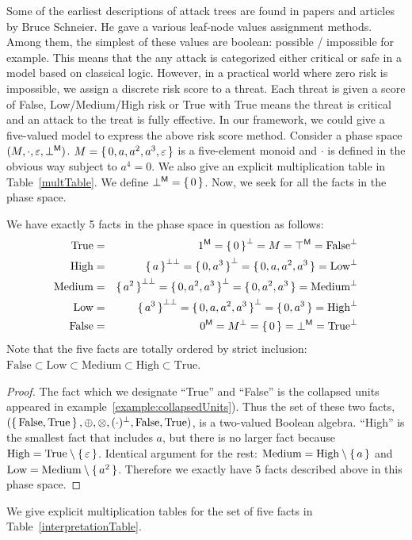 Some of the earliest descriptions of attack trees are found in papers and articles by Bruce Schneier. He gave a various leaf-node values assignment methods. 
Among them, the simplest of these values are boolean:  possible / impossible for example. 
This means that the any attack  is categorized either critical or safe in a model based on classical logic. 
%
However, in a practical world  where zero risk is impossible, 
we assign a discrete risk score  to a threat.
Each threat is given a score of  False,  Low/Medium/High risk or True with True means the threat is critical and an attack to the treat is fully effective. 
%
In our framework, we could give a five-valued model to express the above risk score method.
Consider a phase space  $(M , \cdot , \varepsilon,{\bot}^{\sf M})$.
$M = \set{0,a,a^2,a^3,\varepsilon}$ is a five-element monoid and ${\cdot}$ is defined in the obvious way subject to $a^4 = 0$.
We also give an explicit multiplication table in Table~\ref{multTable}.
%
We define  ${\bot}^{\sf M} = \set{0}$. 
%
Now, we seek for all the facts in the phase space.

\begin{proposition} 
We have exactly  5 facts in the phase space in question as follows:
%
\begin{eqnarray*}
\mbox{True} &=& {\mbox{\boldmath{1}}}^{\sf M} = {{\set{0}}^{\bot}}  = M = {\top}^{\sf M} = {{\mbox{False}}^{\bot}} \\
\mbox{High} &=& {{\set{a}}^{\bot\bot}} = {{\set{0,a^3}}^{\bot}} = \set{0,a,a^2,a^3}  = {{\mbox{Low}}^{\bot}} \\
\mbox{Medium} &=& {{\set{a^2}}^{\bot\bot}} = {{\set{0,a^2,a^3}}^{\bot}} = \set{0,a^2,a^3} = {{\mbox{Medium}}^{\bot}} \\
\mbox{Low} &=& {{\set{a^3}}^{\bot\bot}} = {{\set{0,a,a^2,a^3}}^{\bot}} = \set{0,a^3} = {{\mbox{High}}^{\bot}} \\
\mbox{False} &=& {\mbox{\boldmath{0}}}^{\sf M} = {{M}^{\bot}} =  \set{0} = {\bot}^{\sf M}  = {{\mbox{True}}^{\bot}} \\
\end{eqnarray*}
%
Note that the five facts are totally ordered by strict inclusion: 
 $ \mbox{False} \subset \mbox{Low} \subset \mbox{Medium} \subset \mbox{High} \subset \mbox{True}$. 
\end{proposition}

\begin{proof}
The fact which we designate ``True'' and ``False''  is the collapsed units appeared 
in example~\ref{example:collapsedUnits}). Thus the set of these two facts, 
$(\set{\mbox{False},\mbox{True}},\oplus,\otimes,{(\cdot)^{\bot}},\mbox{False},\mbox{True})$,
 is a two-valued Boolean algebra. 
%
``High'' is the smallest fact that includes $a$, 
but there is no larger fact because $\mbox{High} = \mbox{True} \setminus \set{\varepsilon}$. Identical argument for the rest: 
 $\mbox{Medium} = \mbox{High} \setminus \set{a}$ and
 $\mbox{Low} = \mbox{Medium} \setminus \set{a^2}$. Therefore we exactly have 5 facts described above in this phase space. 
\end{proof}
%
We  give  explicit multiplication tables for the set of five facts
in Table~\ref{interpretationTable}.
%

